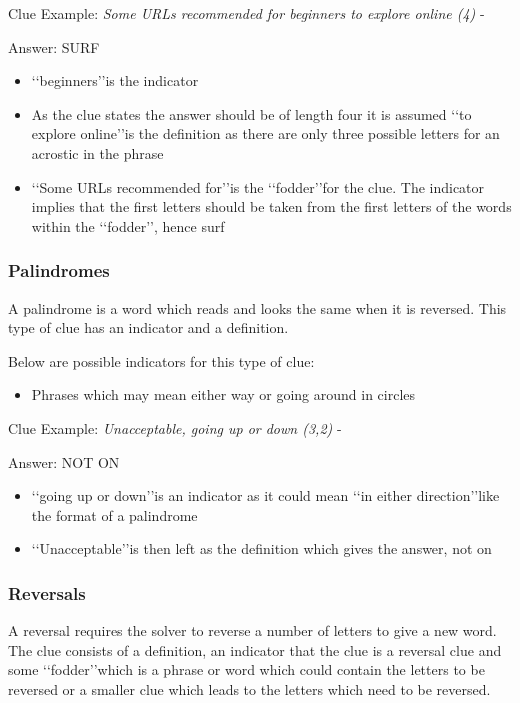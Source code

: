 Clue Example: \emph{Some URLs recommended for beginners to explore online (4)} - \citep{shuchiAcrostics08}

Answer: SURF 

\begin{itemize}
	\item \lq\lq beginners\rq\rq is the indicator 
	\item As the clue states the answer should be of length four it is assumed \lq\lq to explore online\rq\rq is the definition as there are only three possible letters for an acrostic in the phrase 
	\item \lq\lq Some URLs recommended for\rq\rq is the \lq\lq fodder\rq\rq for the clue. The indicator implies that the first letters should be taken from the first letters of the words within the \lq\lq fodder\rq\rq, hence surf  
\end{itemize}
 
\subsubsection{Palindromes}

A palindrome is a word which reads and looks the same when it is reversed. This type of clue has an indicator and a definition. 

Below are possible indicators for this type of clue:
\begin{itemize} 
	\item Phrases which may mean either way or going around in circles
\\
\end{itemize}

Clue Example: \emph{Unacceptable, going up or down (3,2)} - \citep{connorPalindromes12} 

Answer: NOT ON 

\begin{itemize}
	\item \lq\lq going up or down\rq\rq is an indicator as it could mean \lq\lq in either direction\rq\rq like the format of a palindrome 
	\item \lq\lq Unacceptable\rq\rq is then left as the definition which gives the answer, not on 
\end{itemize}

\subsubsection{Reversals}

A reversal requires the solver to reverse a number of letters to give a new word. The clue consists of a definition, an indicator that the clue is a reversal clue and some \lq\lq fodder\rq\rq which is a phrase or word which could contain the letters to be reversed or a smaller clue which leads to the letters which need to be reversed.  

